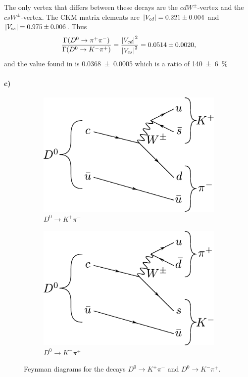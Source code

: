 The only vertex that differs between these decays are the $c d W^\pm$-vertex and the $c s W^\pm$-vertex. The CKM matrix elements are $\abs{V_{cd}} = \num{0.221(4)}$ and $\abs{V_{cs}} = \num{0.975(6)}$. Thus
\begin{equation}
	\frac{\Gamma(D^0 \to \pi^+ \pi^-)}{\Gamma(D^0 \to K^- \pi^+)} = \frac{\abs{V_{cd}}^2}{\abs{V_{cs}}^2} = \num{0.0514(20)},
\end{equation}
and the value found in \cite{particles} is \num{0.0368(5)} which is a ratio of \SI{140(6)}{\percent}

\paragraph{c)}
\begin{figure}[H]
	\centering
	\begin{subfigure}{0.49\textwidth}
		\includegraphics[width=\textwidth]{figures/D0_K+pi-.pdf}
		\caption{$D^0 \to K^+ \pi^-$}
	\end{subfigure}
	\hfill
	\begin{subfigure}{0.49\textwidth}
		\includegraphics[width=\textwidth]{figures/D0_K-pi+.pdf}
		\caption{$D^0 \to K^- \pi^+$}
	\end{subfigure}
	\caption{Feynman diagrams for the decays $D^0 \to K^+ \pi^-$ and $D^0 \to K^- \pi^+$.}
\end{figure}
